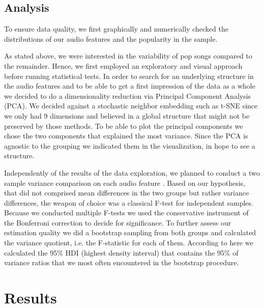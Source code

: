 \documentclass{article}
\begin{document}
\subsection{Analysis}
To ensure data quality, we first graphically and numerically checked the distributions of our audio features and the popularity in the sample.

As stated above, we were interested in the variability of pop songs compared to the remainder. Hence, we first employed an exploratory and visual approach before running statistical tests. In order to search for an underlying structure in the audio features and to be able to get a first impression of the data as a whole we decided to do a dimensionality reduction via Principal Component Analysis (PCA). We decided against a stochastic neighbor embedding such as t-SNE since we only had 9 dimensions and believed in a global structure that might not be preserved by those methods. To be able to plot the principal components we chose the two components that explained the most variance. Since the PCA is agnostic to the grouping we indicated them in the visualization, in hope to see a structure.

Independently of the results of the data exploration, we planned to conduct a two sample variance comparison on each audio feature \citep{snedecor1989}. Based on our hypothesis, that did not comprised mean differences in the two groups but rather variance differences, the weapon of choice was a classical F-test for independent samples. Because we conducted multiple F-tests we used the conservative instrument of the Bonferroni correction to decide for significance. To further assess our estimation quality we did a bootstrap sampling from both groups and calculated the variance quotient, i.e. the F-statistic for each of them. According to  here \cite{kruschke2014doing}
we calculated the 95\% HDI (highest density interval) that contains the 95\% of variance ratios that we most often encountered in the bootstrap procedure.

\section{Results}
\end{document}
